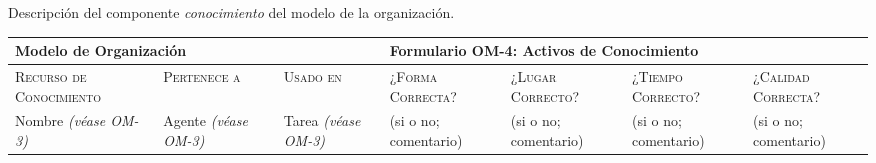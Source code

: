 Descripción del componente \textit{conocimiento} del modelo de la organización.

\begin{table}[H]
\scriptsize
\begin{tabularx}{\textwidth}{|p{1.3cm}|p{1.3cm}|p{1.3cm}|X|X|X|X|} \hline
\multicolumn{3}{|l}{\textbf{Modelo de Organización}} & \multicolumn{4}{|l|}{\textbf{Formulario OM-4: Activos de Conocimiento}} \\ \hline\hline
\textsc{Recurso de Conocimiento} & \textsc{Pertenece a} &  \textsc{Usado en} &  \textsc{¿Forma
Correcta?} & \textsc{¿Lugar Correcto?} & \textsc{¿Tiempo Correcto?} & \textsc{¿Calidad Correcta?}\\ \hline
Nombre \emph{(\textit{véase} OM-3)} & Agente \emph{(\textit{véase} OM-3)}& Tarea \emph{(\textit{véase} OM-3)}& (si o no; comentario)&
(si o no; comentario)& (si o no; comentario)& (si o no; comentario)\\ \hline
\end{tabularx}

  \label{tab.OM4}
\end{table}
 






